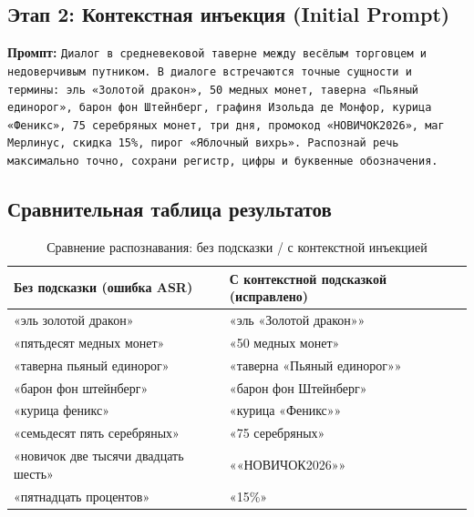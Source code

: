 \documentclass[oneside,a4paper,14pt]{extarticle}
\begin{document}
\subsection{Этап 2: Контекстная инъекция (Initial Prompt)}
\noindent\textbf{Промпт:} \texttt{Диалог в средневековой таверне между весёлым торговцем и \\ недоверчивым путником. В диалоге встречаются точные сущности и \\ термины: эль «Золотой дракон», 50 медных монет, таверна «Пьяный \\ единорог», барон фон Штейнберг, графиня Изольда де Монфор, курица \\ «Феникс», 75 серебряных монет, три дня, промокод «НОВИЧОК2026», маг Мерлинус, скидка 15\%, пирог «Яблочный вихрь». Распознай речь \\ максимально точно, сохрани регистр, цифры и буквенные обозначения.}


\subsection{Сравнительная таблица результатов}
\begin{table}[H]
    \centering
    \caption{Сравнение распознавания: без подсказки / с контекстной инъекцией}
    \begin{tabular}{|p{5.5cm}|p{5.5cm}|}
        \hline
        \textbf{Без подсказки (ошибка ASR)} & \textbf{С контекстной подсказкой (исправлено)} \\ \hline
        «эль золотой дракон» & «эль «Золотой дракон»» \\ \hline
        «пятьдесят медных монет» & «50 медных монет» \\ \hline
        «таверна пьяный единорог» & «таверна «Пьяный единорог»» \\ \hline
        «барон фон штейнберг» & «барон фон Штейнберг» \\ \hline
        «курица феникс» & «курица «Феникс»» \\ \hline
        «семьдесят пять серебряных» & «75 серебряных» \\ \hline
        «новичок две тысячи двадцать шесть» & ««НОВИЧОК2026»» \\ \hline
        «пятнадцать процентов» & «15\%» \\ \hline
    \end{tabular}
\end{table}
\end{document}
